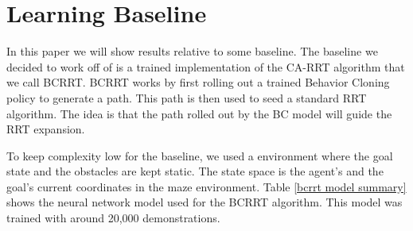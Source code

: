 \documentclass{article}
\begin{document}
\section{Learning Baseline}

In this paper we will show results relative to some baseline. The baseline we decided to work off of is a trained implementation of the CA-RRT algorithm \cite{Zuo} that we call BCRRT. 
BCRRT works by first rolling out a trained Behavior Cloning policy to generate a path. 
This path is then used to seed a standard RRT algorithm. The idea is that the path rolled out by the BC model will guide the RRT expansion. 

To keep complexity low for the baseline, we used a environment where the goal state and the obstacles are kept static. The state space is the agent's and the goal's current coordinates in the maze environment.
Table \ref{bcrrt model summary} shows the neural network model used for the BCRRT algorithm. This model was trained with around 20,000 demonstrations. 
\end{document}
